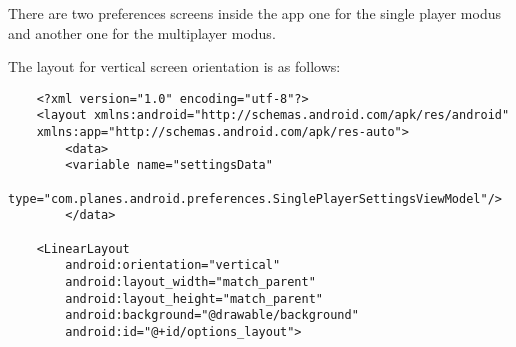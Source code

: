 There are two preferences screens inside the app one for the single player modus and another one for the multiplayer modus. 

The layout for vertical screen orientation is as follows:

\begin{lstlisting}
	<?xml version="1.0" encoding="utf-8"?>
	<layout xmlns:android="http://schemas.android.com/apk/res/android"
	xmlns:app="http://schemas.android.com/apk/res-auto">
		<data>
		<variable name="settingsData"
		type="com.planes.android.preferences.SinglePlayerSettingsViewModel"/>
		</data>
	
	<LinearLayout
		android:orientation="vertical"
		android:layout_width="match_parent"
		android:layout_height="match_parent"
		android:background="@drawable/background"
		android:id="@+id/options_layout">
		

\end{lstlisting}
